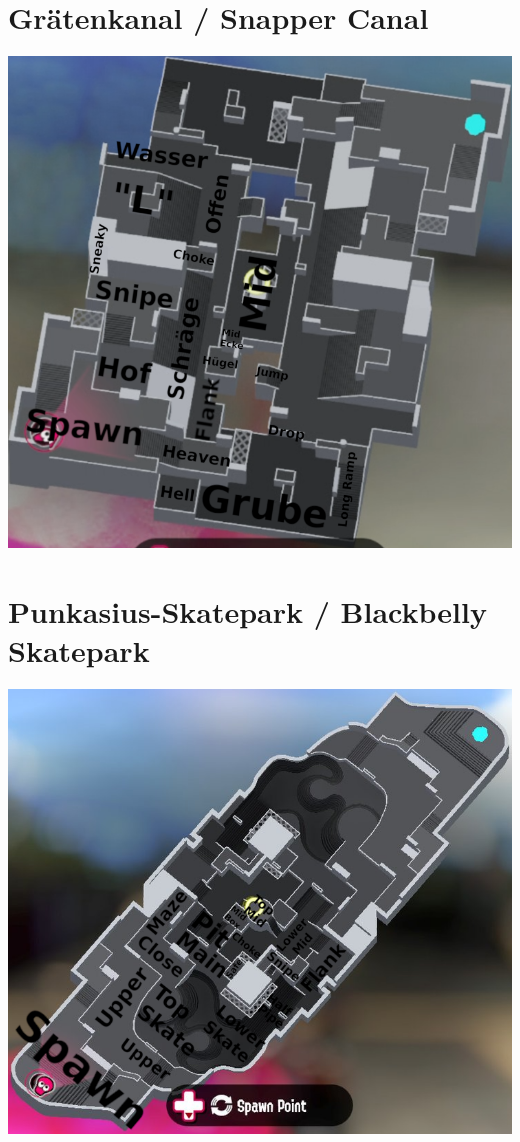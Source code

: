 \documentclass{scrreprt}
\begin{document}
\section{Grätenkanal / Snapper Canal}
\includegraphics[width=\linewidth]{img/snappercanal.png}
\section{Punkasius-Skatepark / Blackbelly Skatepark}
\includegraphics[width=\linewidth]{img/blackbellyskatepark.png}
\end{document}
